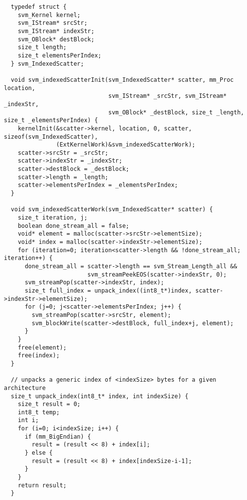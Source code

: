 \clearpage
\makeline
{}
{\small
\begin{verbatim}
  typedef struct {
    svm_Kernel kernel;
    svm_IStream* srcStr;
    svm_IStream* indexStr;
    svm_OBlock* destBlock;
    size_t length;
    size_t elementsPerIndex;
  } svm_IndexedScatter;

  void svm_indexedScatterInit(svm_IndexedScatter* scatter, mm_Proc location, 
                              svm_IStream* _srcStr, svm_IStream* _indexStr, 
                              svm_OBlock* _destBlock, size_t _length, size_t _elementsPerIndex) {
    kernelInit(&scatter->kernel, location, 0, scatter, sizeof(svm_IndexedScatter),
               (ExtKernelWork)&svm_indexedScatterWork);
    scatter->srcStr = _srcStr;
    scatter->indexStr = _indexStr;
    scatter->destBlock = _destBlock;
    scatter->length = _length;
    scatter->elementsPerIndex = _elementsPerIndex;
  }

  void svm_indexedScatterWork(svm_IndexedScatter* scatter) {
    size_t iteration, j;
    boolean done_stream_all = false;
    void* element = malloc(scatter->srcStr->elementSize);
    void* index = malloc(scatter->indexStr->elementSize);
    for (iteration=0; iteration<scatter->length && !done_stream_all; iteration++) {
      done_stream_all = scatter->length == svm_Stream_Length_all && 
                        svm_streamPeekEOS(scatter->indexStr, 0);
      svm_streamPop(scatter->indexStr, index);
      size_t full_index = unpack_index((int8_t*)index, scatter->indexStr->elementSize);
      for (j=0; j<scatter->elementsPerIndex; j++) {
        svm_streamPop(scatter->srcStr, element);
        svm_blockWrite(scatter->destBlock, full_index+j, element);
      }
    }
    free(element);
    free(index);
  }

  // unpacks a generic index of <indexSize> bytes for a given architecture
  size_t unpack_index(int8_t* index, int indexSize) {
    size_t result = 0;
    int8_t temp;
    int i;
    for (i=0; i<indexSize; i++) {
      if (mm_BigEndian) {
        result = (result << 8) + index[i];
      } else {
        result = (result << 8) + index[indexSize-i-1];
      }
    }
    return result;
  }
\end{verbatim}}

